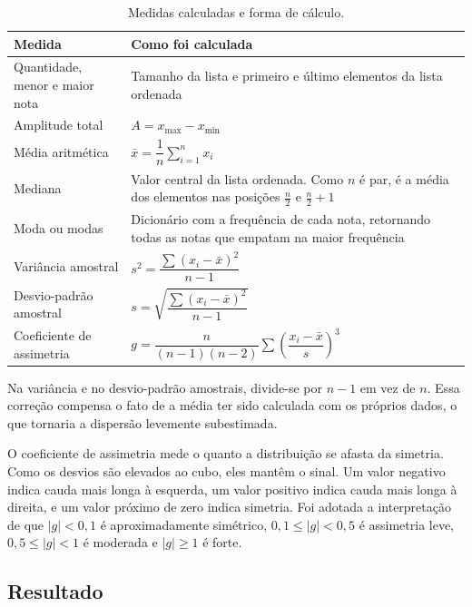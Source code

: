 \documentclass[12pt,a4paper]{article}
\begin{document}
\begin{table}[H]
  \centering
  \caption{Medidas calculadas e forma de cálculo.}
  \label{tab:formulas}
  \renewcommand{\arraystretch}{1.6}
  \begin{tabular}{>{\raggedright}p{4.2cm} p{10.5cm}}
    \toprule
    \textbf{Medida} & \textbf{Como foi calculada} \\
    \midrule
    Quantidade, menor e maior nota & Tamanho da lista e primeiro e último elementos da lista ordenada \\
    Amplitude total & $A = x_{\max} - x_{\min}$ \\
    Média aritmética & $\bar{x} = \dfrac{1}{n}\displaystyle\sum_{i=1}^{n} x_i$ \\
    Mediana & Valor central da lista ordenada. Como $n$ é par, é a média dos elementos nas posições $\frac{n}{2}$ e $\frac{n}{2}+1$ \\
    Moda ou modas & Dicionário com a frequência de cada nota, retornando todas as notas que empatam na maior frequência \\
    Variância amostral & $s^2 = \dfrac{\sum (x_i - \bar{x})^2}{n-1}$ \\
    Desvio-padrão amostral & $s = \sqrt{\dfrac{\sum (x_i - \bar{x})^2}{n-1}}$ \\
    Coeficiente de assimetria & $g = \dfrac{n}{(n-1)(n-2)} \displaystyle\sum \left(\dfrac{x_i - \bar{x}}{s}\right)^3$ \\
    \bottomrule
  \end{tabular}
\end{table}

Na variância e no desvio-padrão amostrais, divide-se por $n-1$ em vez de $n$. Essa correção compensa o fato de a média ter sido calculada com os próprios dados, o que tornaria a dispersão levemente subestimada.

O coeficiente de assimetria mede o quanto a distribuição se afasta da simetria. Como os desvios são elevados ao cubo, eles mantêm o sinal. Um valor negativo indica cauda mais longa à esquerda, um valor positivo indica cauda mais longa à direita, e um valor próximo de zero indica simetria. Foi adotada a interpretação de que $|g| < 0{,}1$ é aproximadamente simétrico, $0{,}1 \le |g| < 0{,}5$ é assimetria leve, $0{,}5 \le |g| < 1$ é moderada e $|g| \ge 1$ é forte.

\subsection{Resultado}
\end{document}
